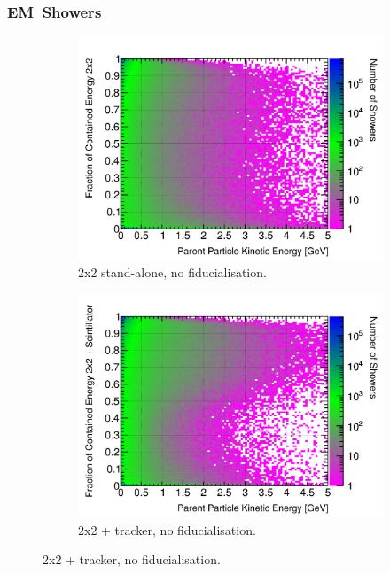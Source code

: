 \documentclass[10pt,a4paper,openany]{article}
\begin{document}
\subsubsection{EM~Showers}
\begin{figure}[htbp]
	\centering
	\begin{subfigure}[b]{0.49\textwidth}
		\centering
		\includegraphics[width=1.0\textwidth]{EM_contained_frac_2x2.png}
		\caption{2x2 stand-alone, no fiducialisation.}
		\label{}
	\end{subfigure}	
	\hfill
	\begin{subfigure}[b]{0.49\textwidth}
		\centering
		\includegraphics[width=1.0\textwidth]{EM_contained_frac_2x2_Scintillator_gap.png}
		\caption{2x2 + tracker, no fiducialisation.}
		\label{}

\end{subfigure}
\end{figure}
\end{document}
